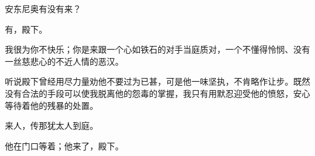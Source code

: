 \documentclass[12pt,a4paper]{book}  %
\begin{document}
\begin{description}[itemsep=1ex,leftmargin=2cm]
    
    \item[{\color{blue} 公爵}]安东尼奥有没有来？
    
    \item[安东尼奥]有，殿下。
    
    \item[公爵]我很为你不快乐；你是来跟一个心如铁石的对手当庭质对，一个不懂得怜悯、没有一丝慈悲心的不近人情的恶汉。
    
    \item[安东尼奥]听说殿下曾经用尽力量劝他不要过为已甚，可是他一味坚执，不肯略作让步。既然没有合法的手段可以使我脱离他的怨毒的掌握，我只有用默忍迎受他的愤怒，安心等待着他的残暴的处置。
    
    \item[公爵]来人，传那犹太人到庭。
    
    \item[萨拉里诺]他在门口等着；他来了，殿下。
    
\end{description}


    
    
    
    
    
    
\end{document}
